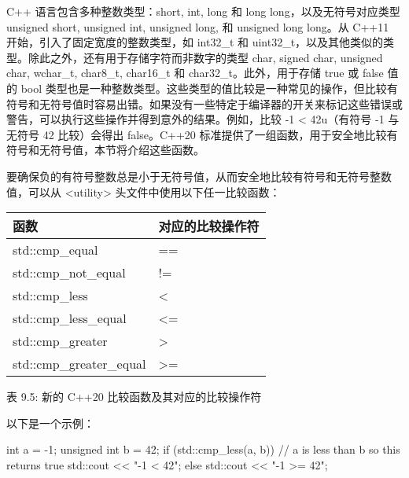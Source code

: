 
C++ 语言包含多种整数类型：short, int, long 和 long long，以及无符号对应类型 unsigned short, unsigned int, unsigned long, 和 unsigned long long。从 C++11 开始，引入了固定宽度的整数类型，如 int32\_t 和 uint32\_t，以及其他类似的类型。除此之外，还有用于存储字符而非数字的类型 char, signed char, unsigned char, wchar\_t, char8\_t, char16\_t 和 char32\_t。此外，用于存储 true 或 false 值的 bool 类型也是一种整数类型。这些类型的值比较是一种常见的操作，但比较有符号和无符号值时容易出错。如果没有一些特定于编译器的开关来标记这些错误或警告，可以执行这些操作并得到意外的结果。例如，比较 -1 < 42u（有符号 -1 与无符号 42 比较）会得出 false。C++20 标准提供了一组函数，用于安全地比较有符号和无符号值，本节将介绍这些函数。


要确保负的有符号整数总是小于无符号值，从而安全地比较有符号和无符号整数值，可以从 <utility> 头文件中使用以下任一比较函数：

\begin{longtable}{|l|l|}
\hline
\textbf{函数}        & \textbf{对应的比较操作符} \\ \hline
\endfirsthead
%
\endhead
%
std::cmp\_equal          & ==                                         \\ \hline
std::cmp\_not\_equal     & !=                                         \\ \hline
std::cmp\_less           & \textless{}                                \\ \hline
std::cmp\_less\_equal    & \textless{}=                               \\ \hline
std::cmp\_greater        & \textgreater{}                             \\ \hline
std::cmp\_greater\_equal & \textgreater{}=                            \\ \hline
\end{longtable}

\begin{center}
表 9.5: 新的 C++20 比较函数及其对应的比较操作符
\end{center}

以下是一个示例：

\begin{cpp}
int a = -1;
unsigned int b = 42;
if (std::cmp_less(a, b)) // a is less than b so this returns true
{
    std::cout << "-1 < 42\n";
}
else
{
    std::cout << "-1 >= 42\n";
}
\end{cpp}

